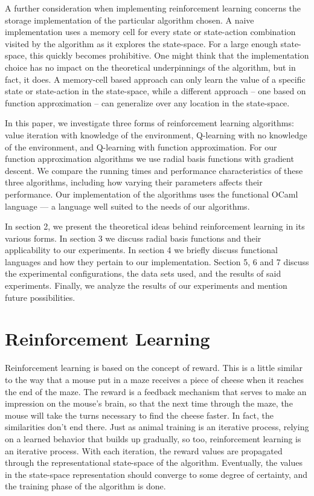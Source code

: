 \documentclass[12pt, letterpaper]{article}
\begin{document}
A further consideration when implementing reinforcement learning concerns the storage implementation of the particular algorithm chosen. A naive implementation uses a memory cell for every state or state-action combination visited by the algorithm as it explores the state-space. For a large enough state-space, this quickly becomes prohibitive. One might think that the implementation choice has no impact on the theoretical underpinnings of the algorithm, but in fact, it does. A memory-cell based approach can only learn the value of a specific state or state-action in the state-space, while a different approach -- one based on function approximation -- can generalize over any location in the state-space. 

In this paper, we investigate three forms of reinforcement learning algorithms: value iteration with knowledge of the environment, Q-learning with no knowledge of the environment, and Q-learning with function approximation. For our function approximation algorithms we use radial basis functions with gradient descent. We compare the running times and performance characteristics of these three algorithms, including how varying their parameters affects their performance. Our implementation of the algorithms uses the functional OCaml language --- a language well suited to the needs of our algorithms.

In section 2, we present the theoretical ideas behind reinforcement learning in its various forms. In section 3 we discuss radial basis functions and their applicability to our experiments. In section 4 we briefly discuss functional languages and how they pertain to our implementation. Section 5, 6 and 7 discuss the experimental configurations, the data sets used, and the results of said experiments. Finally, we analyze the results of our experiments and mention future possibilities. 


\section{Reinforcement Learning}
Reinforcement learning is based on the concept of reward. This is a little similar to the way that a mouse put in a maze receives a piece of cheese when it reaches the end of the maze. The reward is a feedback mechanism that serves to make an impression on the mouse's brain, so that the next time through the maze, the mouse will take the turns necessary to find the cheese faster. In fact, the similarities don't end there. Just as animal training is an iterative process, relying on a learned behavior that builds up gradually, so too, reinforcement learning is an iterative process. With each iteration, the reward values are propagated through the representational state-space of the algorithm. Eventually, the values in the state-space representation should converge to some degree of certainty, and the training phase of the algorithm is done. 
\end{document}
